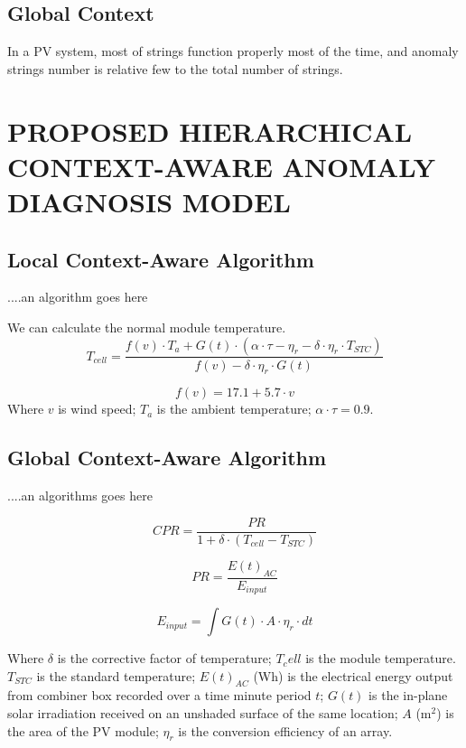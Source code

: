 \documentclass[journal]{IEEEtran}
\begin{document}
\subsection{Global Context}
In a PV system, most of strings function properly most of the time, and anomaly strings number is relative few to the total number of strings.

\section{PROPOSED HIERARCHICAL CONTEXT-AWARE ANOMALY DIAGNOSIS MODEL}
\label{sctn:mdl}
\subsection{Local Context-Aware Algorithm}
....an algorithm goes here

We can calculate the normal module temperature.
\begin{equation}
\label{eqn:Tcell}
T_{cell}= \frac{f(v)\cdot T_a +G(t) \cdot (\alpha \cdot \tau -\eta_r -\delta \cdot \eta_r \cdot T_{STC})}{f(v)-\delta\cdot \eta_r\cdot G(t)}
\end{equation}

\begin{equation}
\label{eqn:fv}
f(v)=17.1+5.7\cdot v
\end{equation}
Where $v$ is wind speed; $T_a$ is the ambient temperature; $\alpha \cdot \tau =0.9$.
\subsection{Global Context-Aware Algorithm}
....an algorithms goes here

\begin{equation}
\label{eqn:input}
CPR= \frac{PR}{1+\delta \cdot (T_{cell}-T_{STC})}
\end{equation}

\begin{equation}
\label{eqn:pr}
PR=\frac{E(t)_{AC}}{E_{input}}
\end{equation}

\begin{equation}
\label{eqn:input}
E_{input}= \int G(t)\cdot A \cdot \eta_r \cdot dt
\end{equation}

Where $\delta$ is the corrective factor of temperature; $T_cell$ is the module temperature. $T_{STC}$ is the standard temperature; $E(t)_{AC}$ (Wh) is the electrical energy output from combiner box recorded over a time minute period $t$; $G(t)$ is the in-plane solar irradiation received on an unshaded surface of the same location; $A$ (m$^2$) is the area of the PV module; $\eta_r$ is the conversion efficiency of an array.
\end{document}

